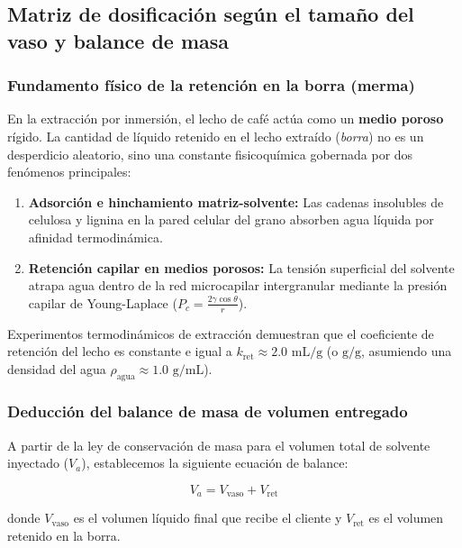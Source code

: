 \documentclass{article}
\begin{document}
\subsection{Matriz de dosificación según el tamaño del vaso y balance de masa}

\subsubsection{Fundamento físico de la retención en la borra (merma)}

En la extracción por inmersión, el lecho de café actúa como un \textbf{medio poroso} rígido. La cantidad de líquido retenido en el lecho extraído (\emph{borra}) no es un desperdicio aleatorio, sino una constante fisicoquímica gobernada por dos fenómenos principales:

\begin{enumerate}
	\item \textbf{Adsorción e hinchamiento matriz-solvente:} Las cadenas insolubles de celulosa y lignina en la pared celular del grano absorben agua líquida por afinidad termodinámica.
	\item \textbf{Retención capilar en medios porosos:} La tensión superficial del solvente atrapa agua dentro de la red microcapilar intergranular mediante la presión capilar de Young-Laplace ($P_c = \frac{2\gamma \cos\theta}{r}$).
\end{enumerate}

Experimentos termodinámicos de extracción demuestran que el coeficiente de retención del lecho es constante e igual a $k_{\text{ret}} \approx 2.0\text{ mL/g}$ (o $\text{g/g}$, asumiendo una densidad del agua $\rho_{\text{agua}} \approx 1.0\text{ g/mL}$).

\subsubsection{Deducción del balance de masa de volumen entregado}

A partir de la ley de conservación de masa para el volumen total de solvente inyectado ($V_a$), establecemos la siguiente ecuación de balance:

\begin{equation}
	V_a = V_{\text{vaso}} + V_{\text{ret}} \label{eq:balance_masa}
\end{equation}

donde $V_{\text{vaso}}$ es el volumen líquido final que recibe el cliente y $V_{\text{ret}}$ es el volumen retenido en la borra.
\end{document}
